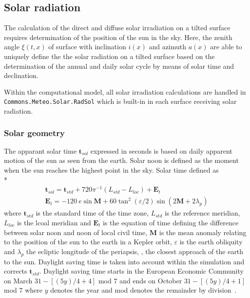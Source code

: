 \subsection{Solar radiation}
\label{chap:climsol}

The calculation of the direct and diffuse solar irradiation on a tilted surface requires determination of the position of the sun in the sky. Here, the zenith angle $\xi(t,x)$ of surface with inclination $i(x)$ and azimuth $a(x)$ are able to uniquely define the the solar radiation on a tilted surface based on the determination of the annual and daily solar cycle by means of solar time and declination.

Within the computational model, all solar irradiation calculations are handled in \texttt{Commons.Meteo.Solar.RadSol} which is built-in in each surface receiving solar radiation.

\subsubsection{Solar geometry}

The apparant solar time $\boldsymbol{t}_{sol}$ expressed in seconds is based on daily apparent motion of the sun as seen from the earth. Solar noon is defined as the moment when the sun reaches the highest point in the sky. Solar time defined as \\*
\begin{gather}
\boldsymbol{t}_{sol} = \boldsymbol{t}_{std} + 720\pi^{-1}\left(L_{std}-L_{loc}\right) + \boldsymbol{E}_{t} \\
\boldsymbol{E}_{t} = -120\ e\sin \boldsymbol{M} + 60\tan^{2} \left(\varepsilon/2\right) \sin \left(2\boldsymbol{M}+2\lambda_{p}\right)
\end{gather}
where $\boldsymbol{t}_{std}$ is the standard time of the time zone, $L_{std}$ is the reference meridian, $L_{loc}$ is the lcoal meridian and $\boldsymbol{E}_{t}$ is the equation of time defining the difference between solar noon and noon of local civil time, $\boldsymbol{M}$ is the mean anomaly relating to the position of the sun to the earth in a Kepler orbit, $\varepsilon$ is the earth obliquity and $\lambda_{p}$ the ecliptic longitude of the periapsis, \ie, the closest approach of the earth to the sun. Daylight saving time is taken into account within the simulation and corrects $\boldsymbol{t}_{std}$. Daylight saving time starts in the European Economic Community on March $31-\left[(5y)/4+4\right]$ mod $7$ and ends on October $31-\left[(5y)/4+1\right]$ mod $7$ where $y$ denotes the year and mod denotes the remainder by division~\cite{VanGent2011}.

